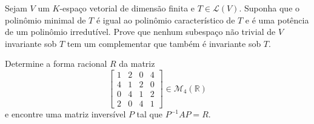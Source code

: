 \documentclass[11pt,a4paper]{article}
\begin{document}
\begin{exercicio} Sejam $V$ um $K$-espaço vetorial de dimensão finita e $T \in \mathcal{L}(V).$ Suponha que o polinômio
minimal de $T$ é igual ao polinômio característico de $T$ e é uma potência de um polinômio irredutível. Prove que nenhum subespaço não trivial de $V$ invariante sob $T$ tem um complementar que também é invariante sob $T.$  
\end{exercicio}
\begin{exercicio} Determine a forma racional $R$ da matriz
\[
\begin{bmatrix}
1 & 2 & 0 & 4\\
4 & 1 & 2 & 0 \\
0 & 4 & 1 & 2 \\
2 & 0 & 4 & 1
\end{bmatrix} \in \mathcal{M}_4(\mathbb{R})
\]
e encontre uma matriz inversível $P$ tal que $P^{-1}AP = R.$
\end{exercicio}
\end{document}

